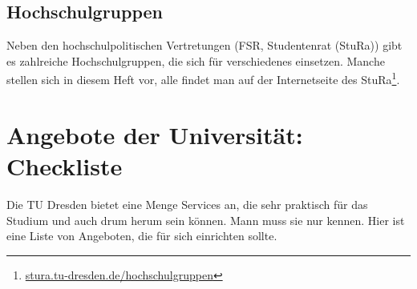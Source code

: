 \documentclass{scrartcl}
\begin{document}
\subsection{Hochschulgruppen}
\label{sub:hochschulgruppen}
Neben den hochschulpolitischen Vertretungen (FSR, Studentenrat (StuRa)) gibt es zahlreiche Hochschulgruppen,
die sich für verschiedenes einsetzen. Manche stellen sich in diesem Heft vor, alle findet man auf der Internetseite des StuRa\footnote{\url{stura.tu-dresden.de/hochschulgruppen}}.

\section{Angebote der Universität: Checkliste}
\label{sec:angebote_der_universitat}
Die TU Dresden bietet eine Menge Services an, die sehr praktisch für das Studium und auch drum herum sein können.
Mann muss sie nur kennen. Hier ist eine Liste von Angeboten, die für sich einrichten sollte.
\newcommand{\clitem}[1]{\item[$\square$ #1]}
\end{document}
